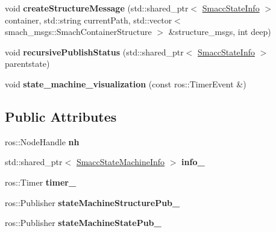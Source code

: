 \begin{DoxyCompactItemize}
\item 
void {\bfseries create\+Structure\+Message} (std\+::shared\+\_\+ptr$<$ \hyperlink{classsmacc_1_1SmaccStateInfo}{Smacc\+State\+Info} $>$ container, std\+::string current\+Path, std\+::vector$<$ smach\+\_\+msgs\+::\+Smach\+Container\+Structure $>$ \&structure\+\_\+msgs, int deep)\hypertarget{structsmacc_1_1SmaccStateMachineBase_ada55ce7b64579bd74f79302f3d587624}{}\label{structsmacc_1_1SmaccStateMachineBase_ada55ce7b64579bd74f79302f3d587624}

\item 
void {\bfseries recursive\+Publish\+Status} (std\+::shared\+\_\+ptr$<$ \hyperlink{classsmacc_1_1SmaccStateInfo}{Smacc\+State\+Info} $>$ parentstate)\hypertarget{structsmacc_1_1SmaccStateMachineBase_a5c078ef0eec2c64ecd9a31b46341b13c}{}\label{structsmacc_1_1SmaccStateMachineBase_a5c078ef0eec2c64ecd9a31b46341b13c}

\item 
void {\bfseries state\+\_\+machine\+\_\+visualization} (const ros\+::\+Timer\+Event \&)\hypertarget{structsmacc_1_1SmaccStateMachineBase_afcee04fc4d307b31d7d0fac932d7d90f}{}\label{structsmacc_1_1SmaccStateMachineBase_afcee04fc4d307b31d7d0fac932d7d90f}

\end{DoxyCompactItemize}
\subsection*{Public Attributes}
\begin{DoxyCompactItemize}
\item 
ros\+::\+Node\+Handle {\bfseries nh}\hypertarget{structsmacc_1_1SmaccStateMachineBase_a191b29227e32c440c936ac05359e9cd5}{}\label{structsmacc_1_1SmaccStateMachineBase_a191b29227e32c440c936ac05359e9cd5}

\item 
std\+::shared\+\_\+ptr$<$ \hyperlink{classsmacc_1_1SmaccStateMachineInfo}{Smacc\+State\+Machine\+Info} $>$ {\bfseries info\+\_\+}\hypertarget{structsmacc_1_1SmaccStateMachineBase_a9b28c1933560c98b33444c68c278f8a5}{}\label{structsmacc_1_1SmaccStateMachineBase_a9b28c1933560c98b33444c68c278f8a5}

\item 
ros\+::\+Timer {\bfseries timer\+\_\+}\hypertarget{structsmacc_1_1SmaccStateMachineBase_a7fc7227a0c6321cf7253683a1f38c4f8}{}\label{structsmacc_1_1SmaccStateMachineBase_a7fc7227a0c6321cf7253683a1f38c4f8}

\item 
ros\+::\+Publisher {\bfseries state\+Machine\+Structure\+Pub\+\_\+}\hypertarget{structsmacc_1_1SmaccStateMachineBase_af586b32d0f79caba26c2dbca76a55767}{}\label{structsmacc_1_1SmaccStateMachineBase_af586b32d0f79caba26c2dbca76a55767}

\item 
ros\+::\+Publisher {\bfseries state\+Machine\+State\+Pub\+\_\+}\hypertarget{structsmacc_1_1SmaccStateMachineBase_a7c76e7a7d6c00d9831472297ff51e38c}{}\label{structsmacc_1_1SmaccStateMachineBase_a7c76e7a7d6c00d9831472297ff51e38c}

\end{DoxyCompactItemize}


